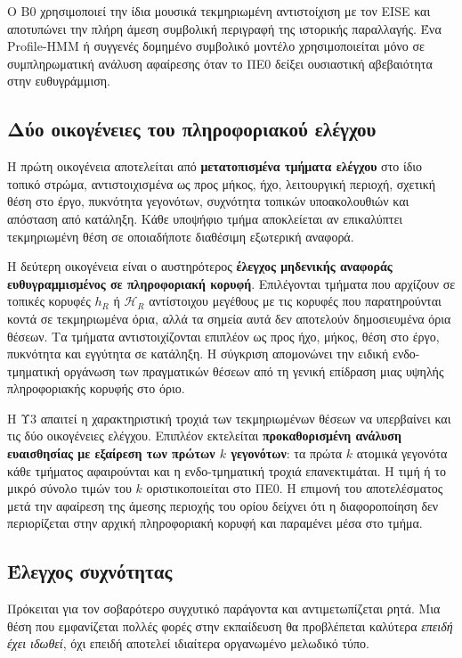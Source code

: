 \documentclass[11pt,a4paper]{article}
\begin{document}
Ο B0 χρησιμοποιεί την ίδια μουσικά τεκμηριωμένη αντιστοίχιση με τον EISE και αποτυπώνει την πλήρη άμεση συμβολική περιγραφή της ιστορικής παραλλαγής. Ένα Profile-HMM ή συγγενές δομημένο συμβολικό μοντέλο χρησιμοποιείται μόνο σε συμπληρωματική ανάλυση αφαίρεσης όταν το ΠΕ0 δείξει ουσιαστική αβεβαιότητα στην ευθυγράμμιση.

\subsection{Δύο οικογένειες του πληροφοριακού ελέγχου}\label{app:match-info-controls}

Η πρώτη οικογένεια αποτελείται από \textbf{μετατοπισμένα τμήματα ελέγχου} στο ίδιο τοπικό στρώμα, αντιστοιχισμένα ως προς μήκος, ήχο, λειτουργική περιοχή, σχετική θέση στο έργο, πυκνότητα γεγονότων, συχνότητα τοπικών υποακολουθιών και απόσταση από κατάληξη. Κάθε υποψήφιο τμήμα αποκλείεται αν επικαλύπτει τεκμηριωμένη θέση σε οποιαδήποτε διαθέσιμη εξωτερική αναφορά.

Η δεύτερη οικογένεια είναι ο αυστηρότερος \textbf{έλεγχος μηδενικής αναφοράς ευθυγραμμισμένος σε πληροφοριακή κορυφή}. Επιλέγονται τμήματα που αρχίζουν σε τοπικές κορυφές \(h_R\) ή \(\mathcal H_R\) αντίστοιχου μεγέθους με τις κορυφές που παρατηρούνται κοντά σε τεκμηριωμένα όρια, αλλά τα σημεία αυτά δεν αποτελούν δημοσιευμένα όρια θέσεων. Τα τμήματα αντιστοιχίζονται επιπλέον ως προς ήχο, μήκος, θέση στο έργο, πυκνότητα και εγγύτητα σε κατάληξη. Η σύγκριση απομονώνει την ειδική ενδο-τμηματική οργάνωση των πραγματικών θέσεων από τη γενική επίδραση μιας υψηλής πληροφοριακής κορυφής στο όριο.

Η Υ3 απαιτεί η χαρακτηριστική τροχιά των τεκμηριωμένων θέσεων να υπερβαίνει και τις δύο οικογένειες ελέγχου. Επιπλέον εκτελείται \textbf{προκαθορισμένη ανάλυση ευαισθησίας με εξαίρεση των πρώτων \(k\) γεγονότων}: τα πρώτα \(k\) ατομικά γεγονότα κάθε τμήματος αφαιρούνται και η ενδο-τμηματική τροχιά επανεκτιμάται. Η τιμή ή το μικρό σύνολο τιμών του \(k\) οριστικοποιείται στο ΠΕ0. Η επιμονή του αποτελέσματος μετά την αφαίρεση της άμεσης περιοχής του ορίου δείχνει ότι η διαφοροποίηση δεν περιορίζεται στην αρχική πληροφοριακή κορυφή και παραμένει μέσα στο τμήμα.

\subsection{Έλεγχος συχνότητας}\label{app:match-frequency}

Πρόκειται για τον σοβαρότερο συγχυτικό παράγοντα και αντιμετωπίζεται ρητά. Μια θέση που εμφανίζεται πολλές φορές στην εκπαίδευση θα προβλέπεται καλύτερα \emph{επειδή έχει ιδωθεί}, όχι επειδή αποτελεί ιδιαίτερα οργανωμένο μελωδικό τύπο.
\end{document}
